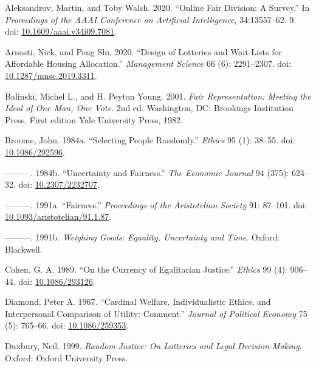 \documentclass[
  11pt,
  letterpaper,
  DIV=11,
  numbers=noendperiod,
  twoside]{scrartcl}
\newlength{\cslhangindent}
\newenvironment{CSLReferences}[2] %
 {\begin{list}{}{%
  \setlength{\itemindent}{0pt}
  \setlength{\leftmargin}{0pt}
  \setlength{\parsep}{0pt}
  \ifodd #1
   \setlength{\leftmargin}{\cslhangindent}
   \setlength{\itemindent}{-1\cslhangindent}
  \fi
  \setlength{\itemsep}{#2\baselineskip}}}
 {\end{list}}
\begin{document}
\protect{}\label{refs}
\begin{CSLReferences}{1}{0}
Aleksandrov, Martin, and Toby Walsh. 2020. {``Online Fair Division: A
Survey.''} In \emph{Proceedings of the AAAI Conference on Artificial
Intelligence}, 34:13557--62. 9. doi:
\href{https://doi.org/10.1609/aaai.v34i09.7081}{10.1609/aaai.v34i09.7081}.

Arnosti, Nick, and Peng Shi. 2020. {``Design of Lotteries and Wait-Lists
for Affordable Housing Allocation.''} \emph{Management Science} 66 (6):
2291--2307. doi:
\href{https://doi.org/10.1287/mnsc.2019.3311}{10.1287/mnsc.2019.3311}.

Balinski, Michel L., and H. Peyton Young. 2001. \emph{Fair
Representation: Meeting the Ideal of One Man, One Vote}. 2nd ed.
Washington, DC: Brookings Institution Press. First edition Yale
University Press, 1982.

Broome, John. 1984a. {``Selecting People Randomly.''} \emph{Ethics} 95
(1): 38--55. doi: \href{https://doi.org/10.1086/292596}{10.1086/292596}.

---------. 1984b. {``Uncertainty and Fairness.''} \emph{The Economic
Journal} 94 (375): 624--32. doi:
\href{https://doi.org/10.2307/2232707}{10.2307/2232707}.

---------. 1991a. {``Fairness.''} \emph{Proceedings of the Aristotelian
Society} 91: 87--101. doi:
\href{https://doi.org/10.1093/aristotelian/91.1.87}{10.1093/aristotelian/91.1.87}.

---------. 1991b. \emph{Weighing Goods: Equality, Uncertainty and Time}.
Oxford: Blackwell.

Cohen, G. A. 1989. {``On the Currency of Egalitarian Justice.''}
\emph{Ethics} 99 (4): 906--44. doi:
\href{https://doi.org/10.1086/293126}{10.1086/293126}.

Diamond, Peter A. 1967. {``Cardinal Welfare, Individualistic Ethics, and
Interpersonal Comparison of Utility: Comment.''} \emph{Journal of
Political Economy} 75 (5): 765--66. doi:
\href{https://doi.org/10.1086/259353}{10.1086/259353}.

Duxbury, Neil. 1999. \emph{Random Justice: On Lotteries and Legal
Decision-Making}. Oxford: Oxford University Press.


\end{CSLReferences}
\end{document}
